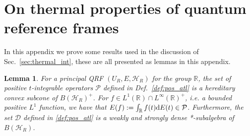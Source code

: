\documentclass[sn-mathphys-num]{sn-jnl}%
\newcommand{\RR}{\mathbb{R}}
\newcommand{\HH}{\mathcal{H}}
\newcommand{\diff}{\textup{d}}
\numberwithin{equation}{section}
\theoremstyle{thmstyleone}%
\newtheorem{lemma}[theorem]{Lemma}
\theoremstyle{thmstyletwo}%
\theoremstyle{thmstylethree}%
\begin{document}
\section{On thermal properties of quantum reference frames}
\label{appx:QRF_thermal_weight}
In this appendix we prove some results used in the discussion of Sec.\ \ref{sec:thermal_int}, these are all presented as lemmas in this appendix.
\begin{lemma}
\label{lem:pos_atl}
    For a principal QRF $(U_R,E,\HH_R)$ for the group $\RR$, the set of positive $t$-integrable operators $\mathcal{P}$ defined in Def.\ \ref{def:pos_atl} is a hereditary convex subcone of $B(\HH_R)^+$. For $f\in L^1(\RR)\cap L^\infty(\RR)^+$, i.e. a bounded positive $L^1$ function, we have that $E(f):=\int_\RR f(t)\diff E(t)\in \mathcal{P}$. Furthermore, the set $\mathcal{D}$ defined in \ref{def:pos_atl} is a weakly and strongly dense *-subalgebra of $B(\HH_R)$.
\end{lemma}
\end{document}
